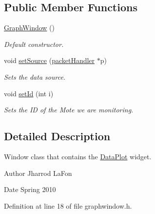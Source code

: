\subsection*{Public Member Functions}
\begin{DoxyCompactItemize}
\item 
\hypertarget{classGraphWindow_ab8ca84cf6fe5a68e7fb87b7f47636d7d}{
\hyperlink{classGraphWindow_ab8ca84cf6fe5a68e7fb87b7f47636d7d}{GraphWindow} ()}
\label{classGraphWindow_ab8ca84cf6fe5a68e7fb87b7f47636d7d}

\begin{DoxyCompactList}\small\item\em Default constructor. \item\end{DoxyCompactList}\item 
void \hyperlink{classGraphWindow_a07a46e21184c287ba49db8145047e420}{setSource} (\hyperlink{classpacketHandler}{packetHandler} $\ast$p)
\begin{DoxyCompactList}\small\item\em Sets the data source. \item\end{DoxyCompactList}\item 
\hypertarget{classGraphWindow_a36355629ca00fac24a8b5e1a4f251624}{
void \hyperlink{classGraphWindow_a36355629ca00fac24a8b5e1a4f251624}{setId} (int i)}
\label{classGraphWindow_a36355629ca00fac24a8b5e1a4f251624}

\begin{DoxyCompactList}\small\item\em Sets the ID of the Mote we are monitoring. \item\end{DoxyCompactList}\end{DoxyCompactItemize}


\subsection{Detailed Description}
Window class that contains the \hyperlink{classDataPlot}{DataPlot} widget. \begin{DoxyAuthor}{Author}
Jharrod LaFon 
\end{DoxyAuthor}
\begin{DoxyDate}{Date}
Spring 2010 
\end{DoxyDate}


Definition at line 18 of file graphwindow.h.




